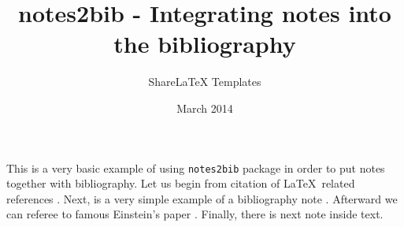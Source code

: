 \documentclass{article}
\title{notes2bib - Integrating notes into the bibliography}
\author{ShareLaTeX Templates}
\date{March 2014}
\begin{document}
\maketitle

This is a very basic example of using \texttt{notes2bib} package in order to put notes together with bibliography. 
Let us begin from citation of \LaTeX\ related references \cite{latexcompanion,knuthwebsite}. Next, is a very simple example of a bibliography note . Afterward we can referee to famous Einstein's paper \cite{einstein}. Finally, there is next note  inside text. 




\end{document}
